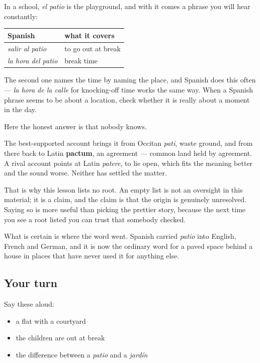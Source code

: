 \begin{grammarlens}[title={Grammar Lens: the school patio}]
In a school, \emph{el patio} is the playground, and with it comes a phrase you will hear constantly:

\noindent
\begin{tabularx}{\linewidth}{@{}>{\raggedright\arraybackslash}X>{\raggedright\arraybackslash}X@{}}
\toprule
\textbf{Spanish} & \textbf{what it covers} \\
\midrule
\emph{salir al patio} & to go out at break \\
\emph{la hora del patio} & break time \\
\bottomrule
\end{tabularx}

The second one names the time by naming the place, and Spanish does this often — \emph{la hora de la calle} for knocking-off time works the same way. When a Spanish phrase seems to be about a location, check whether it is really about a moment in the day.
\end{grammarlens}

\begin{cousinweb}
Here the honest answer is that nobody knows.

The best-supported account brings it from Occitan \emph{pati}, waste ground, and from there back to Latin \textbf{pactum}, an agreement — common land held by agreement. A rival account points at Latin \emph{patere}, to lie open, which fits the meaning better and the sound worse. Neither has settled the matter.

That is why this lesson lists no root. An empty list is not an oversight in this material; it is a claim, and the claim is that the origin is genuinely unresolved. Saying so is more useful than picking the prettier story, because the next time you see a root listed you can trust that somebody checked.

What is certain is where the word went. Spanish carried \emph{patio} into English, French and German, and it is now the ordinary word for a paved space behind a house in places that have never used it for anything else.
\end{cousinweb}

\subsection*{Your turn}
Say these aloud:

\begin{itemize}
\raggedright
  \item a flat with a courtyard
  \item the children are out at break
  \item the difference between a \emph{patio} and a \emph{jardín}
\end{itemize}

